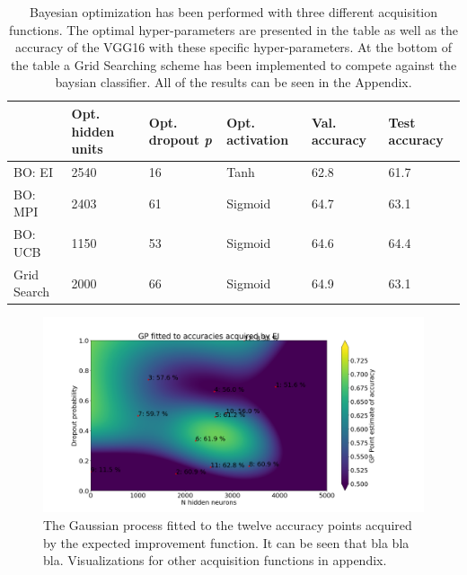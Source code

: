 \documentclass[12pt,fleqn]{article}
\begin{document}
\begin{table}[H]\label{resultater}
	\begin{tabular}{l|lllll}
		  & Opt. hidden units & Opt. dropout \textit{p} & Opt. activation & Val. accuracy &Test accuracy \\ \hline
		BO: EI  & 2540      & 16\pro              & Tanh             &    62.8\pro & 61.7\pro   \\ 
		BO: MPI & 2403         & 61\pro             & Sigmoid             & 64.7\pro  & 63.1\pro     \\ 
		BO: UCB & 1150         & 53\pro              & Sigmoid             & 64.6\pro  & 64.4\pro     \\ 
		Grid Search & 2000         & 66\pro              & Sigmoid             & 64.9\pro & 63.1\pro          \\
	\end{tabular}
\caption{Bayesian optimization has been performed with three different acquisition functions. The optimal hyper-parameters are presented in the table as well as the accuracy of the VGG16 with these specific hyper-parameters. At the bottom of the table a Grid Searching scheme has been implemented to compete against the baysian classifier. All of the results can be seen in the Appendix. }
\end{table}
\begin{figure}[H]
	\centering

	\includegraphics[width=\textwidth]{EIGP}	

\caption{The Gaussian process fitted to the twelve accuracy points acquired by the expected improvement function. It can be seen that bla bla bla. Visualizations for other acquisition functions in appendix.}
\end{figure}
\end{document}
